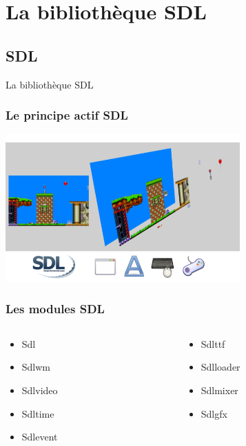 \section[SDL]{La bibliothèque SDL}

\subsection{SDL} %
\begin{frame}
	\begin{center}
		\huge
		La bibliothèque SDL
	\end{center}
\end{frame}

\begin{frame}
	\frametitle{Le principe actif SDL}
	\begin{center}
		\includegraphics[width=9cm]{pics/sdlSurfaces.png}
	\end{center}
\end{frame}

\begin{frame}[fragile]
	\frametitle{Les modules SDL}
	\begin{columns}
		\begin{column}{3cm}
			\begin{itemize}
				\item Sdl
				\item Sdlwm
				\item Sdlvideo
				\item Sdltime
				\item Sdlevent
			\end{itemize}
		\end{column}
		\begin{column}{3cm}
			\begin{itemize}
				\item Sdlttf
				\item Sdlloader
				\item Sdlmixer
				\item Sdlgfx
			\end{itemize}
		\end{column}
	\end{columns}
\end{frame}

